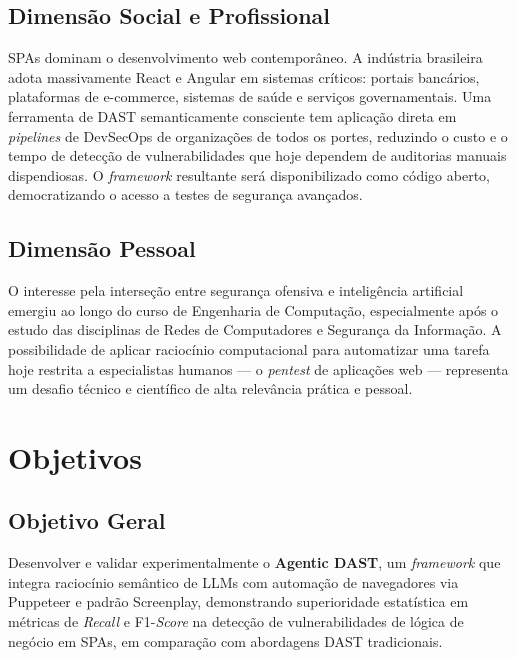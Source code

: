 \documentclass[
    12pt,
    openany,
    oneside,
    a4paper,
    brazil
]{abntex2}
\begin{document}
\section{Dimensão Social e Profissional}

SPAs dominam o desenvolvimento web contemporâneo. A indústria
brasileira adota massivamente React e Angular em sistemas críticos:
portais bancários, plataformas de e-commerce, sistemas de saúde e
serviços governamentais. Uma ferramenta de DAST semanticamente
consciente tem aplicação direta em \textit{pipelines} de DevSecOps de
organizações de todos os portes, reduzindo o custo e o tempo de
detecção de vulnerabilidades que hoje dependem de auditorias manuais
dispendiosas. O \textit{framework} resultante será disponibilizado como
código aberto, democratizando o acesso a testes de segurança avançados.

\section{Dimensão Pessoal}

O interesse pela interseção entre segurança ofensiva e inteligência
artificial emergiu ao longo do curso de Engenharia de Computação,
especialmente após o estudo das disciplinas de Redes de Computadores e
Segurança da Informação. A possibilidade de aplicar raciocínio
computacional para automatizar uma tarefa hoje restrita a especialistas
humanos --- o \textit{pentest} de aplicações web --- representa um
desafio técnico e científico de alta relevância prática e pessoal.

\chapter{Objetivos}

\section{Objetivo Geral}

Desenvolver e validar experimentalmente o \textbf{Agentic DAST}, um
\textit{framework} que integra raciocínio semântico de LLMs com
automação de navegadores via Puppeteer e padrão Screenplay,
demonstrando superioridade estatística em métricas de \textit{Recall}
e F1-\textit{Score} na detecção de vulnerabilidades de lógica de
negócio em SPAs, em comparação com abordagens DAST tradicionais.
\end{document}
